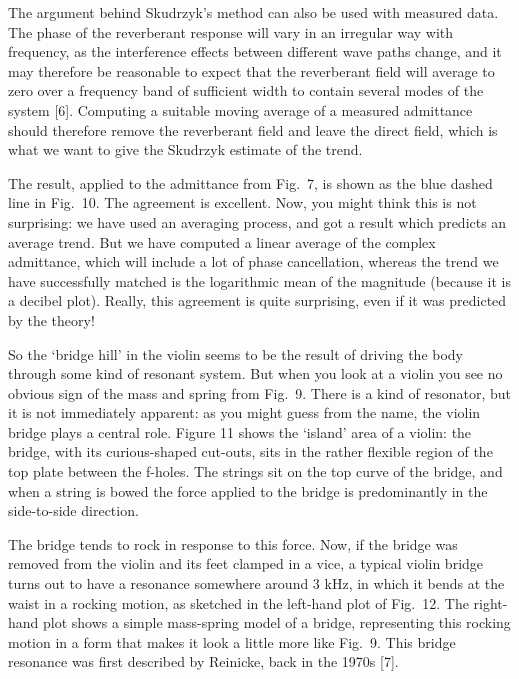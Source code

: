   The argument behind Skudrzyk's method can also be used with measured data. 
  The phase of the reverberant response will vary in an irregular way with 
  frequency, as the interference effects between different wave paths change, 
  and it may therefore be reasonable to expect that the reverberant field will 
  average to zero over a frequency band of sufficient width to contain several 
  modes of the system [6]. Computing a suitable moving average of a measured 
  admittance should therefore remove the reverberant field and leave the direct 
  field, which is what we want to give the Skudrzyk estimate of the trend. 

  The result, applied to the admittance from Fig.\ 7, is shown as the blue 
  dashed line in Fig.\ 10. The agreement is excellent. Now, you might think 
  this is not surprising: we have used an averaging process, and got a result 
  which predicts an average trend. But we have computed a linear average of the 
  complex admittance, which will include a lot of phase cancellation, whereas 
  the trend we have successfully matched is the logarithmic mean of the 
  magnitude (because it is a decibel plot). Really, this agreement is quite 
  surprising, even if it was predicted by the theory! 


  So the `bridge hill' in the violin seems to be the result of driving the body 
  through some kind of resonant system. But when you look at a violin you see 
  no obvious sign of the mass and spring from Fig.\ 9. There is a kind of 
  resonator, but it is not immediately apparent: as you might guess from the 
  name, the violin bridge plays a central role. Figure 11 shows the `island' 
  area of a violin: the bridge, with its curious-shaped cut-outs, sits in the 
  rather flexible region of the top plate between the f-holes. The strings sit 
  on the top curve of the bridge, and when a string is bowed the force applied 
  to the bridge is predominantly in the side-to-side direction. 


  The bridge tends to rock in response to this force. Now, if the bridge was 
  removed from the violin and its feet clamped in a vice, a typical violin 
  bridge turns out to have a resonance somewhere around 3 kHz, in which it 
  bends at the waist in a rocking motion, as sketched in the left-hand plot of 
  Fig.\ 12. The right-hand plot shows a simple mass-spring model of a bridge, 
  representing this rocking motion in a form that makes it look a little more 
  like Fig.\ 9. This bridge resonance was first described by Reinicke, back in 
  the 1970s [7]. 

